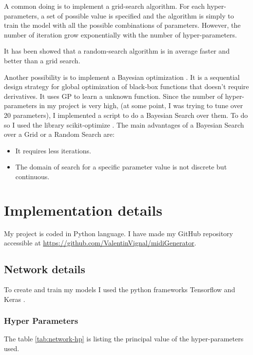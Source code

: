 \documentclass[12pt]{report}
\begin{document}
A common doing is to implement a grid-search algorithm.
For each hyper-parameters, a set of possible value is specified and the algorithm is simply to train the model with all the possible combinations of parameters.
However, the number of iteration grow exponentially with the number of hyper-parameters.

It has been showed that a random-search algorithm is in average faster and better than a grid search.

Another possibility is to implement a Bayesian optimization \cite{frazier_tutorial_2018, adams_tutorial_nodate}.
It is a sequential design strategy for global optimization of black-box functions that doesn't require derivatives.
It uses GP to learn a unknown function.
Since the number of hyper-parameters in my project is very high, (at some point, I was trying to tune over 20 parameters), I implemented a script to do a Bayesian Search over them.
To do so I used the library scikit-optimize \cite{noauthor_scikit-optimize_nodate}.
The main advantages of a Bayesian Search over a Grid or a Random Search are:
\begin{itemize}
    \item It requires less iterations.
    \item The domain of search for a specific parameter value is not discrete but continuous.
\end{itemize}


\section{Implementation details}

My project is coded in Python language.
I have made my GitHub repository accessible at \url{https://github.com/ValentinVignal/midiGenerator}.

\subsection{Network details}

To create and train my models I used the python frameworks Tensorflow \cite{noauthor_tensorflow_nodate} and Keras \cite{noauthor_keras_nodate}.

\subsubsection{Hyper Parameters}

The table \ref{tab:network-hp} is listing the principal value of the hyper-parameters used.
\end{document}
